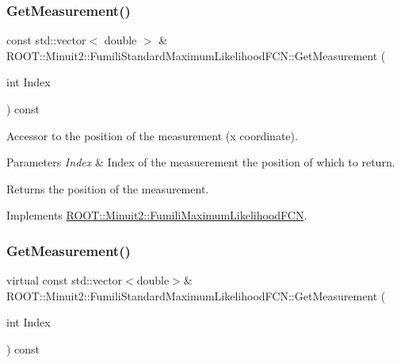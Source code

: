 \subsubsection{\texorpdfstring{GetMeasurement()}{GetMeasurement()}\hspace{0.1cm}{\footnotesize\ttfamily [1/2]}}
{\footnotesize\ttfamily const std\+::vector$<$ double $>$ \& R\+O\+O\+T\+::\+Minuit2\+::\+Fumili\+Standard\+Maximum\+Likelihood\+F\+C\+N\+::\+Get\+Measurement (\begin{DoxyParamCaption}\item[{int}]{Index }\end{DoxyParamCaption}) const\hspace{0.3cm}{\ttfamily [virtual]}}

Accessor to the position of the measurement (x coordinate).


\begin{DoxyParams}{Parameters}
{\em Index} & Index of the measuerement the position of which to return.\\
\hline
\end{DoxyParams}
\begin{DoxyReturn}{Returns}
the position of the measurement. 
\end{DoxyReturn}


Implements \mbox{\hyperlink{classROOT_1_1Minuit2_1_1FumiliMaximumLikelihoodFCN_ac3e28c8d3e14a1df3145891ae99ac35d}{R\+O\+O\+T\+::\+Minuit2\+::\+Fumili\+Maximum\+Likelihood\+F\+CN}}.

\mbox{\label{classROOT_1_1Minuit2_1_1FumiliStandardMaximumLikelihoodFCN_a942bb66ec7d48d9ec0ea3d883dff7378}} 
\subsubsection{\texorpdfstring{GetMeasurement()}{GetMeasurement()}\hspace{0.1cm}{\footnotesize\ttfamily [2/2]}}
{\footnotesize\ttfamily virtual const std\+::vector$<$double$>$\& R\+O\+O\+T\+::\+Minuit2\+::\+Fumili\+Standard\+Maximum\+Likelihood\+F\+C\+N\+::\+Get\+Measurement (\begin{DoxyParamCaption}\item[{int}]{Index }\end{DoxyParamCaption}) const\hspace{0.3cm}{\ttfamily [virtual]}}

